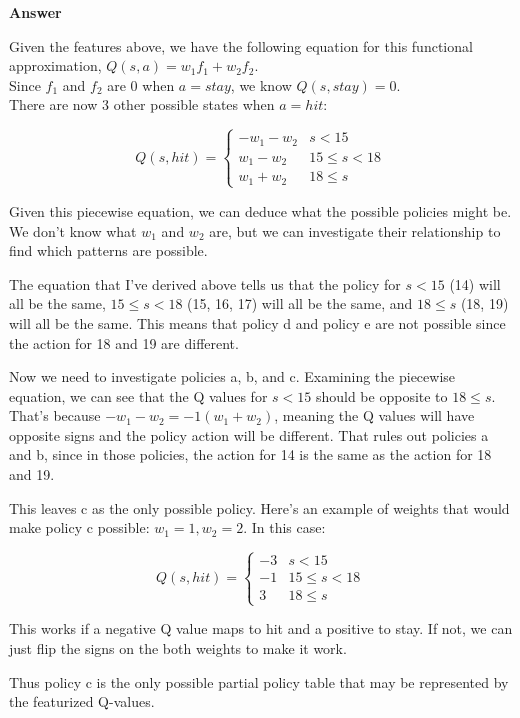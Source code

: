 \documentclass[12pt]{article}
\begin{document}
\noindent \textbf{Answer}

\noindent Given the features above, we have the following equation for this functional approximation, $Q(s,a) = w_1f_1 + w_2f_2$.\\
Since $f_1$ and $f_2$ are 0 when $a = stay$, we know $Q(s, stay) = 0$. \\
There are now 3 other possible states when $a = hit$:

$$
Q(s,hit) = \left\{ \begin{array}{ll}
                  -w_1 - w_2  & s < 15 \\
                  w_1 - w_2 & 15 \leq s < 18 \\
                 w_1 + w_2  & 18 \leq s
                 \end{array} \right.
$$

Given this piecewise equation, we can deduce what the possible policies might be. We don't know what $w_1$ and $w_2$ are, but we can investigate their relationship to find which patterns are possible.

The equation that I've derived above tells us that the policy for $s < 15$ (14) will all be the same, $15 \leq s < 18$ (15, 16, 17) will all be the same, and $18 \leq s$ (18, 19) will all be the same. This means that policy d and policy e are not possible since the action for 18 and 19 are different.

Now we need to investigate policies a, b, and c. Examining the piecewise equation, we can see that the Q values for $s < 15$ should be opposite to $18 \leq s$. That's because $-w_1 - w_2 = -1(w_1 + w_2)$, meaning the Q values will have opposite signs and the policy action will be different. That rules out policies a and b, since in those policies, the action for 14 is the same  as the action for 18 and 19.

This leaves c as the only possible policy. Here's an example of weights that would make policy c possible: $w_1 = 1, w_2 = 2$. In this case:

$$
Q(s,hit) = \left\{ \begin{array}{ll}
                  -3  & s < 15 \\
                  -1 & 15 \leq s < 18 \\
                 3  & 18 \leq s
                 \end{array} \right.
$$

This works if a negative Q value maps to hit and a positive to stay. If not, we can just flip the signs on the both weights to make it work.

Thus policy c is the only possible partial policy table that may be represented by the featurized Q-values.
\end{document}
